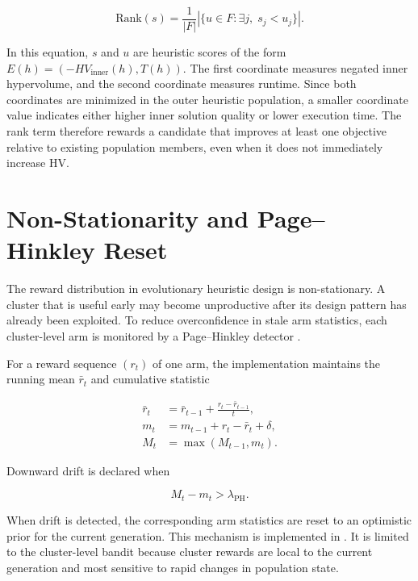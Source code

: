 \begin{equation}
  \mathrm{Rank}(s)
  =
  \frac{1}{|F|}
  \left|\{u \in F : \exists j,\; s_j < u_j\}\right|.
\end{equation}

In this equation, $s$ and $u$ are heuristic scores of the form $E(h)=(-HV_{\text{inner}}(h),T(h))$. The first coordinate measures negated inner hypervolume, and the second coordinate measures runtime. Since both coordinates are minimized in the outer heuristic population, a smaller coordinate value indicates either higher inner solution quality or lower execution time. The rank term therefore rewards a candidate that improves at least one objective relative to existing population members, even when it does not immediately increase HV.

\section{Non-Stationarity and Page--Hinkley Reset}

The reward distribution in evolutionary heuristic design is non-stationary. A cluster that is useful early may become unproductive after its design pattern has already been exploited. To reduce overconfidence in stale arm statistics, each cluster-level arm is monitored by a Page--Hinkley detector \cite{page1954continuous}.

For a reward sequence $(r_t)$ of one arm, the implementation maintains the running mean $\bar{r}_t$ and cumulative statistic

\begin{align}
  \bar{r}_t &= \bar{r}_{t-1} + \frac{r_t-\bar{r}_{t-1}}{t}, \\
  m_t &= m_{t-1}+r_t-\bar{r}_t+\delta, \\
  M_t &= \max(M_{t-1},m_t).
\end{align}

Downward drift is declared when

\begin{equation}
  M_t - m_t > \lambda_{\mathrm{PH}}.
\end{equation}

When drift is detected, the corresponding arm statistics are reset to an optimistic prior for the current generation. This mechanism is implemented in . It is limited to the cluster-level bandit because cluster rewards are local to the current generation and most sensitive to rapid changes in population state.

